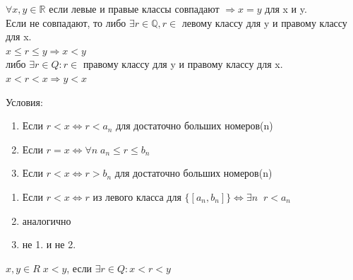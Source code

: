 \documentclass[12pt, a4paper]{article}
\newcommand{\Q}{\mathbb{Q}}
\newcommand{\R}{\mathbb{R}}
\begin{document}
$\forall x, y \in \R$ если левые и правые классы совпадают $\Rightarrow x=y$ для x и y.\\
Если не совпадают, то либо $\exists r \in \Q, r \in $ левому классу для y и правому классу для x.\\
$x \leq r \leq y \Rightarrow x < y$\\
либо $\exists r \in Q: r \in $ правому классу для y и правому классу для x.\\
$x < r < x \Rightarrow y < x$

\begin{tcolorbox}
    Условия:
    \begin{enumerate}
        \item Если $r < x \Leftrightarrow r < a_n$ для достаточно больших номеров(n)
        \item Если $r = x \Leftrightarrow \forall n\; a_n \leq r \leq b_n$
        \item Если $r < x \Leftrightarrow r > b_n $ для достаточно больших номеров(n)
    \end{enumerate}    
\end{tcolorbox}


\begin{tcolorbox}[title=Доказательство 2., breakable]
\begin{enumerate}
    \item Если $r < x \Leftrightarrow r $ из левого класса для $\{ [a_n,b_n] \} \Leftrightarrow \exists n \;\; r < a_n$
    \item аналогично 
    \item не 1. и не 2.
\end{enumerate}
\end{tcolorbox}

\begin{tcolorbox}
    $x, y \in R\; x < y$, если $\exists r \in Q: x < r < y$
\end{tcolorbox}
\end{document}
